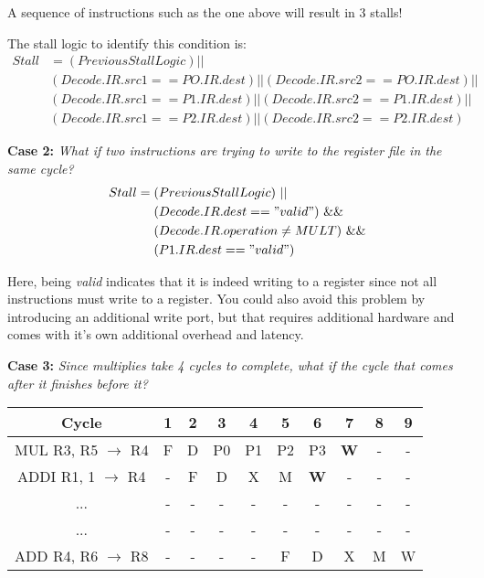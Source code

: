 \documentclass[12pt]{article}
\newenvironment{QandA}{\begin{enumerate}[label=\bfseries\alph*.]\bfseries}
                      {\end{enumerate}}
\newenvironment{answered}{\par\quad\normalfont}{}
\begin{document}
\begin{QandA}
\begin{answered}
    A sequence of instructions such as the one above will result in 3 stalls!
    
    The stall logic to identify this condition is:
    \begin{equation*}
    \begin{split}
    Stall & = (PreviousStallLogic)|| \\ & (Decode.IR.src1 == PO.IR.dest)||  (Decode.IR.src2 == PO.IR.dest)|| \\ & (Decode.IR.src1 == P1.IR.dest)|| 
    (Decode.IR.src2 == P1.IR.dest)|| \\ & (Decode.IR.src1 == P2.IR.dest)|| 
    (Decode.IR.src2 == P2.IR.dest)
    \end{split}
    \end{equation*}    
    
    \textbf{Case 2:} \textit{What if two instructions are trying to write to the register file in the same cycle?}
    \begin{equation*}
    \begin{split}
    Stall & = (PreviousStallLogic)\ || \\ &\ \ \ \ (Decode.IR.dest == "valid")\ \&\& \\  &\ \ \ \ (Decode.IR.operation \neq MULT)\ \&\& \\ &\ \ \ \  (P1.IR.dest == "valid")
    \end{split}
    \end{equation*}  
    
    Here, being \textit{valid} indicates that it is indeed writing to a register since not all instructions must write to a register. You could also avoid this problem by introducing an additional write port, but that requires additional hardware and comes with it's own additional overhead and latency.
    
    \textbf{Case 3:} \textit{Since multiplies take 4 cycles to complete, what if the cycle that comes after it finishes before it?}
    \begin{center}
    \begin{tabular}{ |c|c|c|c|c|c|c|c|c|c| } 
     \hline
     Cycle & 1 & 2 & 3 & 4 & 5 & 6 & 7 & 8 & 9\\ 
     \hline
     MUL R3, R5 $\rightarrow$ R4 & F & D & P0 & P1 & P2 & P3 & \textbf{W} & - & -\\ 
     ADDI R1, 1 $\rightarrow$ R4 & - & F & D & X & M & \textbf{W} & - & - & - \\ 
     ... & - & - & - & - & - & - & - & - & - \\
     ... & - & - & - & - & - & - & - & - & - \\
     ADD R4, R6 $\rightarrow$ R8 & - & - & - & - & F & D & X & M & W \\ 
     \hline
    \end{tabular}
    \end{center} 
    

\end{answered}
\end{QandA}
\end{document}
